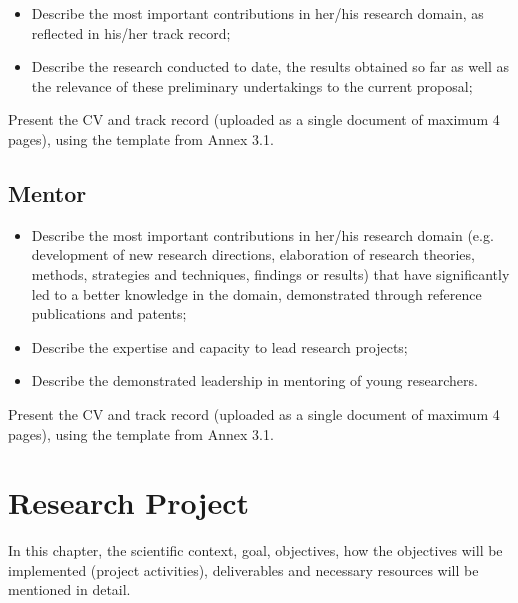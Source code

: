 \documentclass[draftproposal,pncdib]{pncdi-pd}
\begin{document}
\begin{pncdiexplanation}
\begin{itemize}
\item
Describe the most important contributions in her/his research domain, as reflected
in his/her track record;

\item
Describe the research conducted to date, the results obtained so far as well as the
relevance of these preliminary undertakings to the current proposal;
\end{itemize}
\medskip

Present the CV and track record (uploaded as a single document of maximum 4 pages),
using the template from Annex 3.1.
\end{pncdiexplanation}

\subsection{Mentor}
\label{sc:perf:mentor}

\begin{pncdiexplanation}
\begin{itemize}
\item
Describe the most important contributions in her/his research domain (e.g. development of
new research directions, elaboration of research theories, methods, strategies and
techniques, findings or results) that have significantly led to a better knowledge in
the domain, demonstrated through reference publications and patents;

\item
Describe the expertise and capacity to lead research projects;

\item Describe the demonstrated leadership in mentoring of young researchers.
\end{itemize}
\medskip

Present the CV and track record (uploaded as a single document of maximum 4 pages), using the template
from Annex 3.1.
\end{pncdiexplanation}

\section{Research Project}
\label{sc:project}

\begin{pncdiexplanation}
In this chapter, the scientific context, goal, objectives, how the objectives will be
implemented (project activities), deliverables and necessary resources will be mentioned
in detail.
\end{pncdiexplanation}
\end{document}
